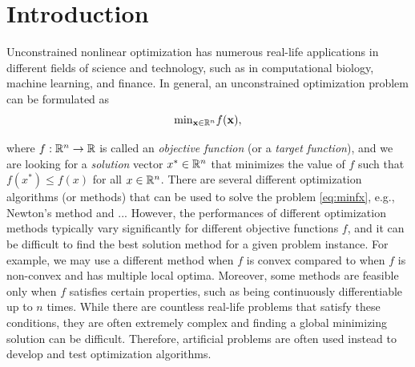 \documentclass[a4paper,english,titlepage,12pt]{article}
\newcommand{\vect}[1]{\ensuremath{\mathbf{#1}}}
\newcommand{\R}{\ensuremath\mathbb{R}}
\begin{document}
\section{Introduction}

Unconstrained nonlinear optimization has numerous real-life applications in different fields of science and technology, such as in computational biology, machine learning, and finance.
In general, an unconstrained optimization problem can be formulated as
\begin{equation}\label{eq:minfx}
    \mathrm{min}_{\vect{x} \in \R^n} f(\vect{x}),
\end{equation}

where $f : \R^n \rightarrow \R$ is called an \emph{objective function} (or a \emph{target function}), and we are looking for a \emph{solution} vector $x^* \in \R^n$ that minimizes the value of $f$ such that $f(x^*) \leq f(x)$ for all $x\in \R^n$. There are several different optimization algorithms (or methods) that can be used to solve the problem \eqref{eq:minfx}, e.g., Newton's method and ... However, the performances of different optimization methods typically vary significantly for different objective functions $f$, and it can be difficult to find the best solution method for a given problem instance. For example, we may use a different method when $f$ is convex compared to when $f$ is non-convex and has multiple local optima. Moreover, some methods are feasible only when $f$ satisfies certain properties, such as being continuously differentiable up to $n$ times.
While there are countless real-life problems that satisfy these conditions, they are often extremely complex and finding a global minimizing solution can be difficult. 
Therefore, artificial problems are often used instead to develop and test optimization algorithms. \cite{test_function_collection_artifical}
\end{document}
